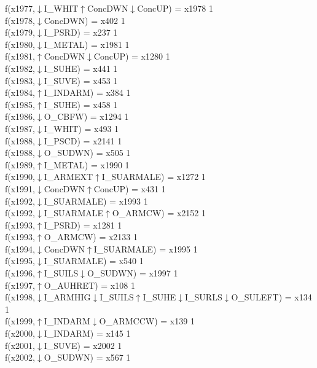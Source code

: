 f(x1977,$\downarrow$I\_WHIT$\uparrow$ConcDWN$\downarrow$ConcUP) = x1978 {1} \\
f(x1978,$\downarrow$ConcDWN) = x402 {1} \\
f(x1979,$\downarrow$I\_PSRD) = x237 {1} \\
f(x1980,$\downarrow$I\_METAL) = x1981 {1} \\
f(x1981,$\uparrow$ConcDWN$\downarrow$ConcUP) = x1280 {1} \\
f(x1982,$\downarrow$I\_SUHE) = x441 {1} \\
f(x1983,$\downarrow$I\_SUVE) = x453 {1} \\
f(x1984,$\uparrow$I\_INDARM) = x384 {1} \\
f(x1985,$\uparrow$I\_SUHE) = x458 {1} \\
f(x1986,$\downarrow$O\_CBFW) = x1294 {1} \\
f(x1987,$\downarrow$I\_WHIT) = x493 {1} \\
f(x1988,$\downarrow$I\_PSCD) = x2141 {1} \\
f(x1988,$\downarrow$O\_SUDWN) = x505 {1} \\
f(x1989,$\uparrow$I\_METAL) = x1990 {1} \\
f(x1990,$\downarrow$I\_ARMEXT$\uparrow$I\_SUARMALE) = x1272 {1} \\
f(x1991,$\downarrow$ConcDWN$\uparrow$ConcUP) = x431 {1} \\
f(x1992,$\downarrow$I\_SUARMALE) = x1993 {1} \\
f(x1992,$\downarrow$I\_SUARMALE$\uparrow$O\_ARMCW) = x2152 {1} \\
f(x1993,$\uparrow$I\_PSRD) = x1281 {1} \\
f(x1993,$\uparrow$O\_ARMCW) = x2133 {1} \\
f(x1994,$\downarrow$ConcDWN$\uparrow$I\_SUARMALE) = x1995 {1} \\
f(x1995,$\downarrow$I\_SUARMALE) = x540 {1} \\
f(x1996,$\uparrow$I\_SUILS$\downarrow$O\_SUDWN) = x1997 {1} \\
f(x1997,$\uparrow$O\_AUHRET) = x108 {1} \\
f(x1998,$\downarrow$I\_ARMHIG$\downarrow$I\_SUILS$\uparrow$I\_SUHE$\downarrow$I\_SURLS$\downarrow$O\_SULEFT) = x134 {1} \\
f(x1999,$\uparrow$I\_INDARM$\downarrow$O\_ARMCCW) = x139 {1} \\
f(x2000,$\downarrow$I\_INDARM) = x145 {1} \\
f(x2001,$\downarrow$I\_SUVE) = x2002 {1} \\
f(x2002,$\downarrow$O\_SUDWN) = x567 {1} \\
